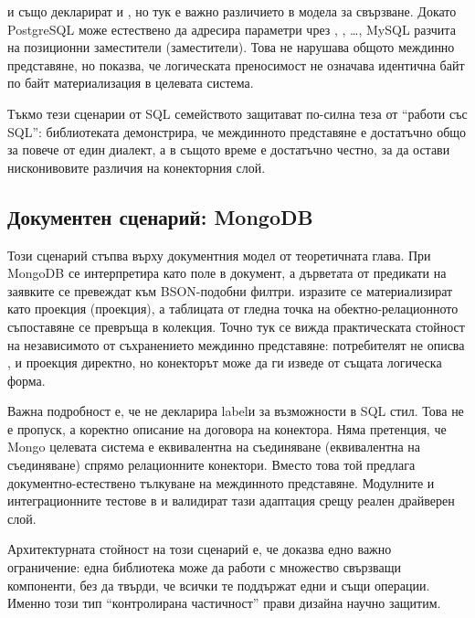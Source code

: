  и  също декларират  и , но тук е важно различието в модела за свързване. Докато PostgreSQL може естествено да адресира параметри чрез , , \ldots{}, MySQL разчита на позиционни  заместители (заместители). Това не нарушава общото междинно представяне, но показва, че логическата преносимост не означава идентична байт по байт материализация в целевата система.

Тъкмо тези сценарии от SQL семейството защитават по-силна теза от ``работи със SQL'': библиотеката демонстрира, че междинното представяне е достатъчно общо за повече от един диалект, а в същото време е достатъчно честно, за да остави нисконивовите различия на конекторния слой.

\subsection{Документен сценарий: MongoDB}

Този сценарий стъпва върху документния модел от теоретичната глава. При MongoDB  се интерпретира като поле в документ, а дърветата от предикати на заявките се превеждат към BSON-подобни филтри.  изразите се материализират като проекция (проекция), а таблицата от гледна точка на обектно-релационното съпоставяне се превръща в колекция. Точно тук се вижда практическата стойност на независимото от съхранението междинно представяне: потребителят не описва ,  и проекция директно, но конекторът може да ги изведе от същата логическа форма.

Важна подробност е, че  не декларира labelи за възможности в SQL стил. Това не е пропуск, а коректно описание на договора на конектора. Няма претенция, че Mongo целевата система е еквивалентна на съединяване (еквивалентна на съединяване) спрямо релационните конектори. Вместо това той предлага документно-естествено тълкуване на междинното представяне. Модулните и интеграционните тестове в  и  валидират тази адаптация срещу реален драйверен слой.

Архитектурната стойност на този сценарий е, че доказва едно важно ограничение: една библиотека може да работи с множество свързващи компоненти, без да твърди, че всички те поддържат едни и същи операции. Именно този тип ``контролирана частичност'' прави дизайна научно защитим.

